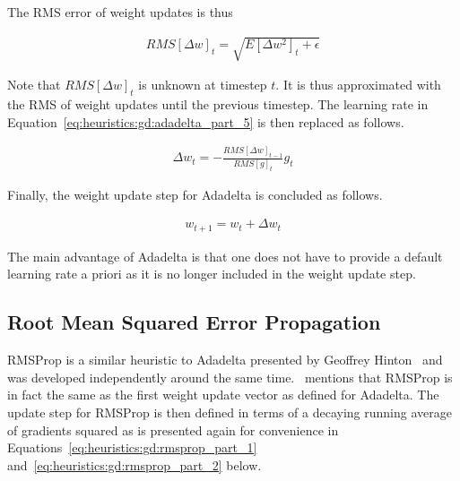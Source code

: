 The \ac{RMS} error of weight updates is thus

\begin{equation}
      \label{eq:heuristics:gd:adadelta_part_7}
      \begin{split}
            RMS[\Delta w]_{t} = \sqrt{E[\Delta w^{2}]_{t} + \epsilon}
      \end{split}
\end{equation}

Note that $RMS[\Delta w]_{t}$ is unknown at timestep $t$. It is thus approximated with the \acs{RMS} of weight updates until the previous timestep. The learning rate in Equation~\ref{eq:heuristics:gd:adadelta_part_5} is then replaced as follows.

\begin{equation}
      \label{eq:heuristics:gd:adadelta_part_8}
      \begin{split}
            \Delta w_{t} = - \frac{RMS[\Delta w]_{t-1}}{RMS[g]_{t}} g_{t}
      \end{split}
\end{equation}

Finally, the weight update step for \ac{Adadelta} is concluded as follows.

\begin{equation}
      \label{eq:heuristics:gd:adadelta_part_9}
      \begin{split}
            w_{t+1} = w_{t} + \Delta w_{t}
      \end{split}
\end{equation}

The main advantage of \ac{Adadelta} is that one does not have to provide a default learning rate a priori as it is no longer included in the weight update step.

\subsection{Root Mean Squared Error Propagation}
\label{sec:heuristics:rmsprop}

\Ac{RMSProp} is a similar heuristic to \ac{Adadelta} presented by Geoffrey Hinton~\cite{ref:hinton:2012} and was developed independently around the same time.~\citeauthor{ref:ruder:2016}\cite{ref:ruder:2016} mentions that \ac{RMSProp} is in fact the same as the first weight update vector as defined for \ac{Adadelta}. The update step for \ac{RMSProp} is then defined in terms of a decaying running average of gradients squared as is presented again for convenience in Equations~\ref{eq:heuristics:gd:rmsprop_part_1} and~\ref{eq:heuristics:gd:rmsprop_part_2} below.


